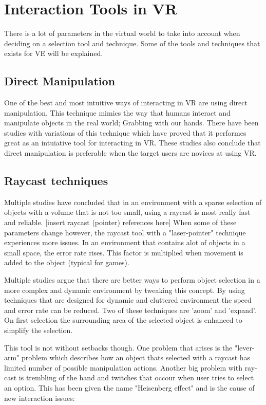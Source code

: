 \section{Interaction Tools in VR}
\label{theory:toolsandtech}
There is a lot of parameters in the virtual world to take into account when deciding on a selection tool and technique. Some of the tools and techniques that exists for VE will be explained.
\subsection{Direct Manipulation}
One of the best and most intuitive ways of interacting in VR are using direct  manipulation.\cite{tools:jacoby1994gestural} This technique mimics the way that humans interact and manipulate objects in the real world; Grabbing with our hands. There have been studies with variations of this technique which have proved that it performes great as an intuiative tool for interacting in VR.\cite{tools:Buchmann2004,tools:Cutler1997} These studies also conclude that direct manipulation is preferable when the target users are novices at using VR.
\subsection{Raycast techniques}
\label{theory:toolsandtech:raycast}
Multiple studies have concluded that in an environment with a sparse selection of objects with a volume that is not too small, using a raycast is most really fast and reliable. [insert raycast (pointer) references here] When some of these parameters change however, the raycast tool with a "laser-pointer" technique experiences more issues. In an environment that contains alot of objects in a small space, the error rate rises. This factor is multiplied when movement is added to the object (typical for games).

Multiple studies argue that there are better ways to perform object selection in a more complex and dynamic environment by tweaking this concept.\cite{selection:Argelaguet2008,interactions:Bowman1997} By using techniques that are designed for dynamic and cluttered environment the speed and error rate can be reduced. Two of these techniques are 'zoom' and 'expand'. On first selection the surrounding area of the selected object is enhanced to simplify the selection.

This tool is not without setbacks though. One problem that arises is the "lever-arm" problem which describes how an object thats selected with a raycast has limited number of possible manipulation actions.\cite{interactions:Poupyrev1996} Another big problem with ray-cast is trembling of the hand and twitches that occour when user tries to select an option. This has been given the name "Heisenberg effect" and is the cause of new interaction issues\cite{selection:Bowman2001}:

